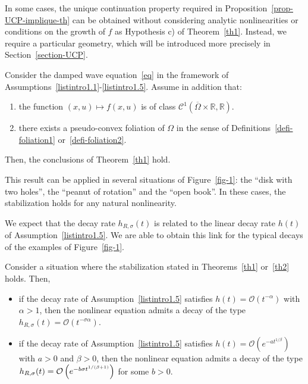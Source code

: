 \documentclass[AHL,Unicode,longabstracts]{cedram}
\newcommand{\RR}{\mathbb{R}}
\newcommand{\Cc}{\mathcal{C}}
\newcommand{\Oc}{\mathcal{O}}
\newcommand*{\alphenumi}{\renewcommand*{\theenumi}{\alph{enumi}}}
\begin{document}
In some cases, the unique continuation property required in Proposition~\ref{prop-UCP-implique-th} can be obtained without considering analytic nonlinearities or conditions on the growth of $f$ as Hypothesis c) of Theorem~\ref{th1}. Instead, we require a particular geometry, which will be introduced more precisely in Section~\ref{section-UCP}.
\goodbreak

\begin{theo}\label{th2}
Consider the damped wave equation~\eqref{eq} in the framework of Assumptions~\eqref{listintro1.1}-\eqref{listintro1.5}. Assume in addition that:
\begin{enumerate}\alphenumi
\item \label{listtheo1.2.1}the function $(x,u)\mapsto f(x,u)$ is of class $\Cc^1\left(\overline{\Omega}\times \RR,\RR\right)$.
\item \label{listtheo1.2.2}there exists a pseudo-convex foliation of $\Omega$ in the sense of Definitions~\ref{defi-foliation1} or~\ref{defi-foliation2}.
\end{enumerate}
Then, the conclusions of Theorem~\ref{th1} hold.
\end{theo}

This result can be applied in several situations of Figure~\ref{fig-1}: the ``disk with two holes'', the ``peanut of rotation'' and the ``open book''. In these cases, the stabilization holds for any natural nonlinearity.

We expect that the decay rate $h_{R,\sigma}(t)$ is related to the linear decay rate $h(t)$ of Assumption~\eqref{listintro1.5}. We are able to obtain this link for the typical decays of the examples of Figure~\ref{fig-1}.

\begin{prop}\label{prop1}
Consider a situation where the stabilization stated in Theorems~\ref{th1} or~\ref{th2} holds. Then,
\begin{itemize}
\item if the decay rate of Assumption~\eqref{listintro1.5} satisfies $h(t)=\Oc({t^{-\alpha}})$ with $\alpha>1$, then the nonlinear equation admits a decay of the type $h_{R,\sigma}(t)= \Oc (t^{-\sigma\alpha})$.
\item if the decay rate of Assumption~\eqref{listintro1.5} satisfies $h(t)=\Oc \left(e^{-a {t^{1/\beta}}}\right)$ with $a>0$ and $\beta>0$, then the nonlinear equation admits a decay of the type $h_{R,\sigma}(t)\linebreak= \Oc \left(e^{-b\sigma t^{1/(\beta+1)}}\right)$ for some $b>0$.
\end{itemize}
\end{prop}
\end{document}
